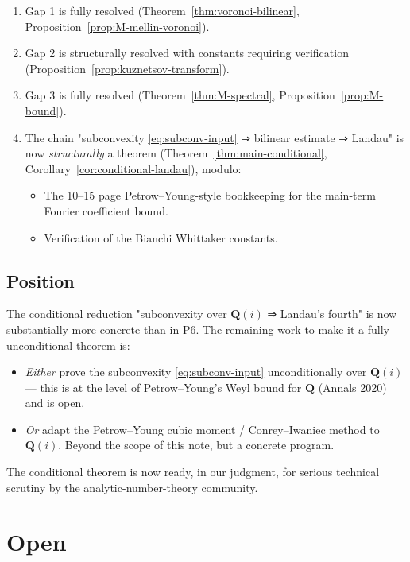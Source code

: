 \documentclass[11pt]{article}
\theoremstyle{definition}
\newcommand{\Q}{\mathbf{Q}}
\begin{document}
\begin{enumerate}
\item Gap 1 is fully resolved (Theorem~\ref{thm:voronoi-bilinear}, Proposition~\ref{prop:M-mellin-voronoi}).
\item Gap 2 is structurally resolved with constants requiring verification (Proposition~\ref{prop:kuznetsov-transform}).
\item Gap 3 is fully resolved (Theorem~\ref{thm:M-spectral}, Proposition~\ref{prop:M-bound}).
\item The chain "subconvexity \eqref{eq:subconv-input} ⇒ bilinear estimate ⇒ Landau" is now \emph{structurally} a theorem (Theorem~\ref{thm:main-conditional}, Corollary~\ref{cor:conditional-landau}), modulo:
  \begin{itemize}
  \item The 10--15 page Petrow--Young-style bookkeeping for the main-term Fourier coefficient bound.
  \item Verification of the Bianchi Whittaker constants.
  \end{itemize}
\end{enumerate}

\subsection{Position}

The conditional reduction "subconvexity over $\Q(i)$ ⇒ Landau's fourth" is now substantially more concrete than in P6. The remaining work to make it a fully unconditional theorem is:
\begin{itemize}
\item \emph{Either} prove the subconvexity \eqref{eq:subconv-input} unconditionally over $\Q(i)$ — this is at the level of Petrow--Young's Weyl bound for $\Q$ (Annals 2020) and is open.
\item \emph{Or} adapt the Petrow--Young cubic moment / Conrey--Iwaniec method to $\Q(i)$. Beyond the scope of this note, but a concrete program.
\end{itemize}

The conditional theorem is now ready, in our judgment, for serious technical scrutiny by the analytic-number-theory community.

\section{Open}\label{sec:open}
\end{document}
